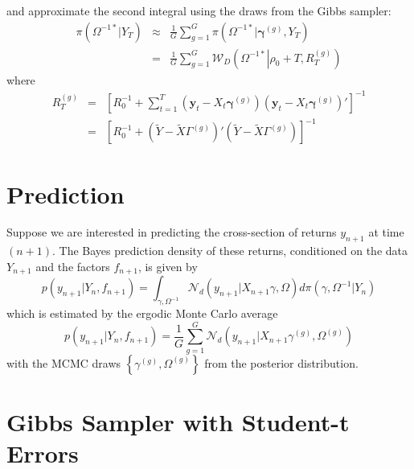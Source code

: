 \documentclass[12pt]{article}
\begin{document}
and approximate the second integral using the draws from the Gibbs sampler:
\begin{eqnarray*}
  \pi\left( \Omega^{-1*}|Y_T \right) &\approx& \frac{1}{G}\sum_{g=1}^G \pi\left( \Omega^{-1*}|\boldsymbol{\gamma}^{(g)},Y_T \right)\\
  &=& \frac{1}{G}\sum_{g=1}^G \mathcal{W}_D\left(\Omega^{-1*}\left|\rho_0 + T, R_T^{\left( g \right)}\right. \right) 
\end{eqnarray*}
where
\begin{eqnarray*}
  R_T^{(g)} &=&  \left[ R_0^{-1} + \sum_{t=1}^{T} \left( \mathbf{y}_t - X_t \boldsymbol{\gamma}^{(g)} \right)\left( \mathbf{y}_t - X_t \boldsymbol{\gamma}^{(g)} \right)' \right]^{-1}\\
  &=& \left[  R_0^{-1} + \left( \widetilde{Y} - \widetilde{X} \Gamma^{(g)} \right)'\left( \widetilde{Y} - \widetilde{X} \Gamma^{(g)} \right)\right]^{-1}
\end{eqnarray*}



\section{Prediction}

Suppose we are interested in predicting the cross-section of returns $y_{n+1}
$ at time $(n+1)$. The Bayes prediction density of these returns,
conditioned on the data $Y_{n+1}$ and the factors $f_{n+1}$, is given by%
\begin{equation*}
p(y_{n+1}|Y_{n},f_{n+1})=\int_{\gamma ,\Omega ^{-1}}\mathcal{N}_{d}\left(
y_{n+1}|X_{n+1}\gamma ,\Omega \right) d\pi \left( \gamma ,\Omega
^{-1}|Y_{n}\right)
\end{equation*}%
which is estimated by the ergodic Monte Carlo average
\begin{equation*}
p(y_{n+1}|Y_{n},f_{n+1})=\frac{1}{G}\sum_{g=1}^{G}\mathcal{N}_{d}\left(
y_{n+1}|X_{n+1}\gamma ^{(g)},\Omega ^{(g)}\right)
\end{equation*}%
with the MCMC draws $\left\{ \gamma ^{(g)},\Omega ^{(g)}\right\} $ from the
posterior distribution.


\section{Gibbs Sampler with Student-t Errors}
\end{document}
